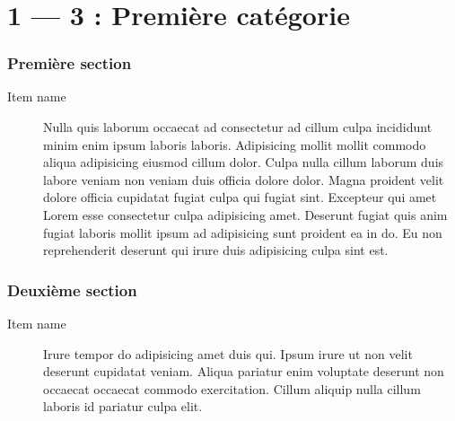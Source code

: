 \documentclass{article}
\author{}
\begin{document}
\title{\vspace{-0.5cm}{\Huge Titreeeeeeeee du document} \vspace{-1cm}}

\date{}

\maketitle



\part*{1 --- 3 : Première catégorie}
\section{Première section}
\begin{description}
	\item [Item name] Nulla quis laborum occaecat ad consectetur ad cillum culpa incididunt minim enim ipsum laboris laboris. Adipisicing mollit mollit commodo aliqua adipisicing eiusmod cillum dolor. Culpa nulla cillum laborum duis labore veniam non veniam duis officia dolore dolor. Magna proident velit dolore officia cupidatat fugiat culpa qui fugiat sint. Excepteur qui amet Lorem esse consectetur culpa adipisicing amet. Deserunt fugiat quis anim fugiat laboris mollit ipsum ad adipisicing sunt proident ea in do. Eu non reprehenderit deserunt qui irure duis adipisicing culpa sint est.
\end{description}
\section{Deuxième section}
\begin{description}
	\item [Item name] Irure tempor do adipisicing amet duis qui. Ipsum irure ut non velit deserunt cupidatat veniam. Aliqua pariatur enim voluptate deserunt non occaecat occaecat commodo exercitation. Cillum aliquip nulla cillum laboris id pariatur culpa elit.
\end{description}
\end{document}

